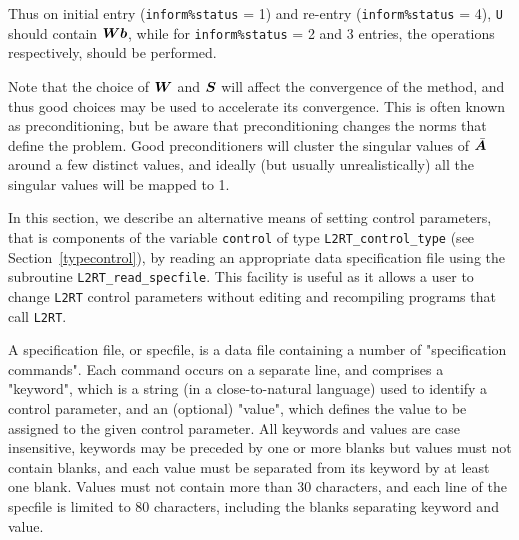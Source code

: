 \documentclass{galahad}
\newcommand{\packagename}{L2\-RT}
\begin{document}
Thus on initial entry ({\tt inform\%status} = 1) and re-entry
({\tt inform\%status} = 4), {\tt U} should contain ${\bm{W}} {\bm{b}}$,
while for {\tt inform\%status} = 2 and 3 entries, the operations
respectively, should be performed.

Note that the choice of ${\bm{W}}$ and ${\bm{S}}$ will affect the convergence of the
method, and thus good choices may be used to accelerate its convergence. This
is often known as preconditioning, but be aware that preconditioning changes
the norms that define the problem. Good preconditioners will cluster
the singular values of $\bar{{\bm{A}}}$ around a few distinct values, and ideally
(but usually unrealistically) all the singular values will be mapped to 1.




\galfeatures
\noindent In this section, we describe an alternative means of setting
control parameters, that is components of the variable {\tt control} of type
{\tt \packagename\_control\_type}
(see Section~\ref{typecontrol}),
by reading an appropriate data specification file using the
subroutine {\tt \packagename\_read\_specfile}. This facility
is useful as it allows a user to change  {\tt \packagename} control parameters
without editing and recompiling programs that call {\tt \packagename}.

A specification file, or specfile, is a data file containing a number of
"specification commands". Each command occurs on a separate line,
and comprises a "keyword",
which is a string (in a close-to-natural language) used to identify a
control parameter, and
an (optional) "value", which defines the value to be assigned to the given
control parameter. All keywords and values are case insensitive,
keywords may be preceded by one or more blanks but
values must not contain blanks, and
each value must be separated from its keyword by at least one blank.
Values must not contain more than 30 characters, and
each line of the specfile is limited to 80 characters,
including the blanks separating keyword and value.
\end{document}
